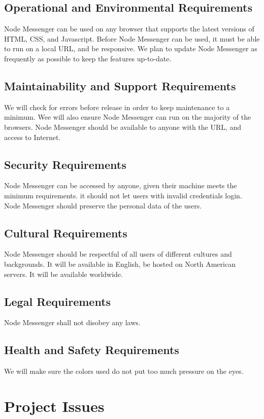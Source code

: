 \documentclass[12pt, titlepage]{article}
\begin{document}
    	\subsection{Operational and Environmental Requirements}
		Node Messenger can be used on any browser that supports the latest versions of HTML, CSS, and Javascript. Before Node Messenger can be used, it must be able to run on a local URL, and be responsive. We plan to update Node Messenger as frequently as possible to keep the features up-to-date.
    	\subsection{Maintainability and Support Requirements}
		We will check for errors before release in order to keep maintenance to a minimum. Wee will also ensure Node Messenger can run on the majority of the browsers. Node Messenger should be available to anyone with the URL, and access to Internet.
    	\subsection{Security Requirements}
		Node Messenger can be accessed by anyone, given their machine meets the minimum requirements. it should not let users with invalid credentials login. Node Messenger should preserve the personal data of the users.
    	\subsection{Cultural Requirements}
		Node Messenger should be respectful of all users of different cultures and backgrounds. It will be available in English, be hosted on North American servers. It will be available worldwide. 
	    \subsection{Legal Requirements}
		Node Messenger shall not disobey any laws.
    	\subsection{Health and Safety Requirements}
		We will make sure the colors used do not put too much pressure on the eyes. 
	
	\newpage
    \section{Project Issues}
\end{document}
